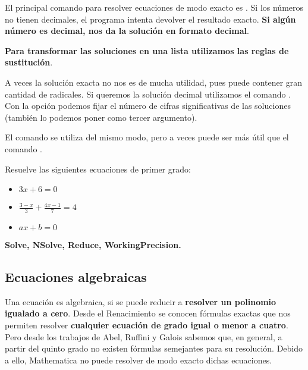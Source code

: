 \documentclass[a4paper,10pt, draft]{article}
\newcommand{\com}[1]{\textbf{\color{blue}{#1}}}
\newenvironment{ejer}{\begin{tcolorbox}[center title, title=Ejercicios,
fonttitle=\sffamily\bfseries,colback=blue!5,colframe=orange]}{\end{tcolorbox}}
\newenvironment{funciones}{\begin{tcolorbox}[center title, title=Nuevas funciones, fonttitle=\sffamily\bfseries, colback=green!5!white,colframe=red!75!black]}{\end{tcolorbox}\bigskip}
\begin{document}
El principal comando  para resolver ecuaciones de modo exacto es \com{Solve[p==q,x]}.  Si los números no tienen decimales, el programa intenta devolver el resultado exacto. \textbf{Si algún número es decimal, nos da la solución en formato decimal}. 

\textbf{Para transformar las soluciones en una lista utilizamos las reglas de sustitución}.
 
 A veces la solución exacta no nos es de mucha utilidad, pues puede contener gran cantidad de radicales. Si queremos la solución decimal utilizamos el comando
  \com{NSolve[p==q,x]}. Con la opción \com{WorkingPrecision} podemos fijar el número de cifras significativas de las soluciones (también lo podemos poner como tercer argumento). 
  
  El comando \com{Reduce[p==q,x]} se utiliza del mismo modo, pero a veces puede ser más útil que el comando \com{Solve}.
  

  
\begin{ejer}

Resuelve las siguientes ecuaciones de primer grado:


\begin{itemize}

\item  $3x+6=0$


\item  $\displaystyle \frac{3-x}{3}+\frac{4x-1}{7} = 4$


\item  $ax+b=0$

\end{itemize}

\end{ejer}  

\enlargethispage{1 cm}

\begin{funciones}

\textbf{Solve, NSolve, Reduce, WorkingPrecision.}

\end{funciones}

\newpage

\subsection{Ecuaciones algebraicas}

Una ecuación es algebraica, si se puede reducir a \textbf{resolver un polinomio igualado a cero}. Desde el Renacimiento se conocen fórmulas exactas que nos permiten resolver \textbf{cualquier ecuación de grado igual o menor a cuatro}. Pero desde los trabajos de Abel, Ruffini y Galois sabemos que, en general, a partir del quinto grado no existen fórmulas semejantes para su resolución. Debido a ello, Mathematica  no puede resolver de modo exacto dichas ecuaciones.
\end{document}
